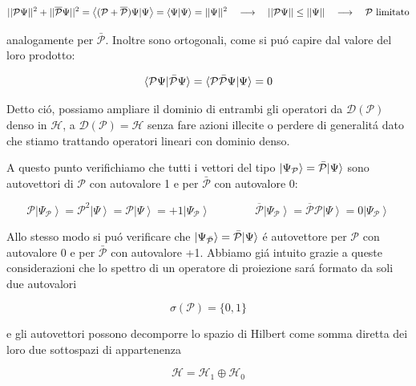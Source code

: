$$||{\cal P}\Psi||^{2}+||\overline{{\cal P}}\Psi||^{2}=\left\langle({\cal P}+\overline{{\cal P}})\Psi|\Psi\right\rangle=\left\langle\Psi|\Psi\right\rangle=||\Psi||^{2}\quad\longrightarrow\quad||{\cal P}\Psi||\leq||\Psi||\quad\longrightarrow\quad\mathcal{P}\text{ limitato}$$

analogamente per $\bar{\mathcal{P}}$. Inoltre sono ortogonali, come si pu\'o capire dal valore del loro prodotto:

$$\braket{\mathcal{P}\Psi}{\bar{\mathcal{P}}\Psi} = \braket{\mathcal{P}\bar{\mathcal{P}}\Psi}{\Psi} = 0$$

Detto ci\'o, possiamo ampliare il dominio di entrambi gli operatori da $\mathcal{D}(\mathcal{P})$ denso in $\mathcal{H}$, a $\mathcal{D}(\mathcal{P}) = \mathcal{H}$ senza fare azioni illecite o perdere di generalit\'a dato che stiamo trattando operatori lineari con dominio denso.

A questo punto verifichiamo che tutti i vettori del tipo $\ket{\Psi_{\mathcal{P}}} = \bar{\mathcal{P}} \ket{\Psi}$ sono autovettori di $\mathcal{P}$ con autovalore 1 e per $\bar{\mathcal{P}}$ con autovalore 0:

$${\mathcal{P}}\left|\Psi_{\mathcal{P}}\right\rangle={\mathcal{P}}^{2}\left|\Psi\right\rangle={\mathcal{P}}\left|\Psi\right\rangle=+1\left|\Psi_{\mathcal{P}}\right\rangle \qquad\qquad \overline{{{\mathcal{P}}}}\left|\Psi_{\mathcal{P}}\right\rangle=\overline{{{\mathcal{P}}}}\mathcal{P}\left|\Psi\right\rangle=0\left|\Psi_{\mathcal{P}}\right\rangle$$

Allo stesso modo si pu\'o verificare che $\ket{\Psi_{\bar{\mathcal{P}}}} = \bar{\mathcal{P}} \ket{\Psi}$ \'e autovettore per $\mathcal{P}$ con autovalore $0$ e per $\bar{\mathcal{P}}$ con autovalore
+1. Abbiamo gi\'a intuito grazie a queste considerazioni che lo spettro di un operatore di proiezione sar\'a formato da soli due autovalori 

$$\sigma(\mathcal{P}) = \{0, 1\}$$

e gli autovettori possono decomporre lo spazio di Hilbert come somma diretta dei loro due sottospazi di appartenenza 

$$\mathcal{H} = \mathcal{H}_1 \oplus \mathcal{H}_0$$

